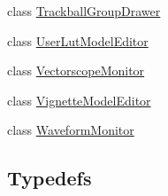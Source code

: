 \begin{DoxyCompactItemize}
\item 
class \mbox{\hyperlink{class_unity_editor_1_1_post_processing_1_1_trackball_group_drawer}{Trackball\+Group\+Drawer}}
\item 
class \mbox{\hyperlink{class_unity_editor_1_1_post_processing_1_1_user_lut_model_editor}{User\+Lut\+Model\+Editor}}
\item 
class \mbox{\hyperlink{class_unity_editor_1_1_post_processing_1_1_vectorscope_monitor}{Vectorscope\+Monitor}}
\item 
class \mbox{\hyperlink{class_unity_editor_1_1_post_processing_1_1_vignette_model_editor}{Vignette\+Model\+Editor}}
\item 
class \mbox{\hyperlink{class_unity_editor_1_1_post_processing_1_1_waveform_monitor}{Waveform\+Monitor}}
\end{DoxyCompactItemize}
\subsection*{Typedefs}
